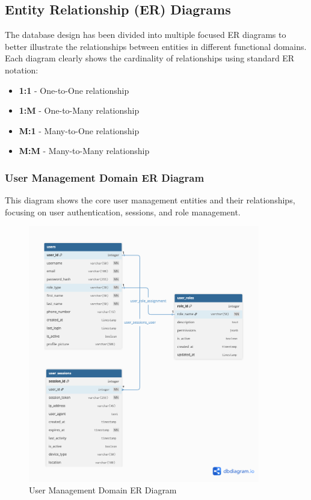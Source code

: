 \documentclass[12pt,a4paper,oneside]{book}
\begin{document}
\subsection{Entity Relationship (ER) Diagrams}

The database design has been divided into multiple focused ER diagrams to better illustrate the relationships between entities in different functional domains. Each diagram clearly shows the cardinality of relationships using standard ER notation:

\begin{itemize}
    \item \textbf{1:1} - One-to-One relationship
    \item \textbf{1:M} - One-to-Many relationship  
    \item \textbf{M:1} - Many-to-One relationship
    \item \textbf{M:M} - Many-to-Many relationship
\end{itemize}

\subsubsection{User Management Domain ER Diagram}

This diagram shows the core user management entities and their relationships, focusing on user authentication, sessions, and role management.

\begin{figure}[H]
    \centering
    \includegraphics[width=0.9\textwidth]{assets/ER/Figure4.7.png}
    \caption{User Management Domain ER Diagram}
    \label{fig:user_er}
\end{figure}
\end{document}
